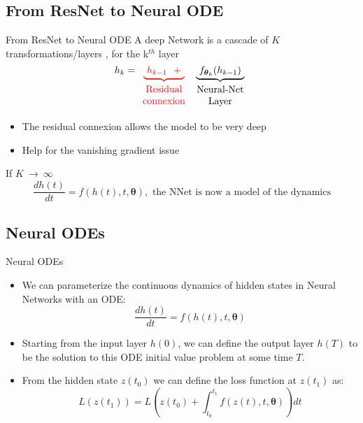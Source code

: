 \documentclass{EESD}
\newcommand{\x}{\ensuremath{h}}
\newcommand{\params}{\ensuremath{\boldsymbol{\theta}}}
\begin{document}
\subsection{From ResNet to Neural ODE}
\begin{frame}{From ResNet to Neural ODE}
  A deep Network is a cascade of $K$ transformations/layers , for the k$^{th}$ layer
  $$
  \x_k = { \color{red} \underbrace{\ \x_{k-1}\ \ +\ }_{
      \begin{array}{c}
        \text{Residual}\\
        \text{connexion}
      \end{array}
    } }
  \underbrace{\ f_{\params_k} (\x_{k-1}) \ }_{
    \begin{array}{c}
      \text{Neural-Net}\\
      \text{Layer}
    \end{array}
  }
  $$
  
  \begin{itemize}
  \item The residual connexion allows the model to be very deep 
  \item Help for the vanishing gradient issue
  \end{itemize}


  \begin{alertblock}{If $K \ \longrightarrow\ \infty$}
        $$\frac{dh(t)}{dt} = f(h(t), t, \params), \text{ the NNet is now a model of the dynamics}$$
  \end{alertblock}
  
\end{frame}

\subsection{Neural ODEs}
\begin{frame}[t]{Neural ODEs}
\begin{itemize}
    \item We can parameterize the continuous dynamics of hidden states in Neural Networks with an ODE:\vspace{10pt}
    \begin{equation}
        \frac{dh(t)}{dt} = f(h(t), t, \params) 
    \end{equation}\pause
    \item Starting from the input layer $h(0)$, we can define the output layer $h(T)$ to be the solution to this ODE initial value problem at some time $T$.\vspace{10pt}\pause
    \item From the hidden state $z(t_0)$ we can define the loss function at $z(t_1)$ as:
    \begin{equation}
        L(z(t_1)) = L(z(t_0)+\int_{t_0}^{t_1} f(z(t), t, \params))dt
    \end{equation}\vspace{10pt}
\end{itemize}
\end{frame}
\end{document}
